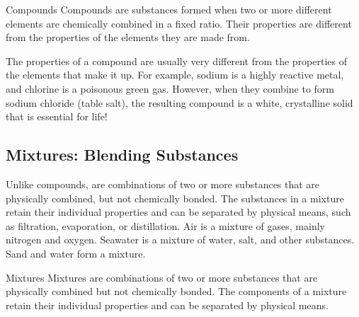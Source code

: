 \begin{keyconcept}{Compounds}
Compounds are substances formed when two or more different elements are chemically combined in a fixed ratio.  Their properties are different from the properties of the elements they are made from.
\end{keyconcept}

The properties of a compound are usually very different from the properties of the elements that make it up. For example, sodium is a highly reactive metal, and chlorine is a poisonous green gas.  However, when they combine to form sodium chloride (table salt), the resulting compound is a white, crystalline solid that is essential for life!

\subsection{Mixtures: Blending Substances}


Unlike compounds,  are combinations of two or more substances that are physically combined, but not chemically bonded.  The substances in a mixture retain their individual properties and can be separated by physical means, such as filtration, evaporation, or distillation.  Air is a mixture of gases, mainly nitrogen and oxygen.  Seawater is a mixture of water, salt, and other substances.  Sand and water form a mixture.

\begin{keyconcept}{Mixtures}
Mixtures are combinations of two or more substances that are physically combined but not chemically bonded.  The components of a mixture retain their individual properties and can be separated by physical means.
\end{keyconcept}

